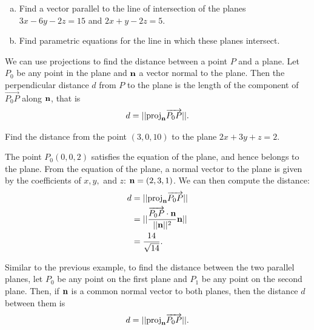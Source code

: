 \documentclass[12pt,letterpaper,reqno]{article}
\numberwithin{equation}{section}
\newcommand{\fixme}[1]{{\color{orange}{[#1]}}}
\begin{document}
\begin{exercise}
\begin{enumerate}[(a)]
	\item Find a vector parallel to the line of intersection of the planes $3x-6y-2z=15$ and $2x+y-2z=5$.	
	\item Find parametric equations for the line in which these planes intersect.
\end{enumerate}
\end{exercise}

\fixme{Add solution.}

\begin{example}
	We can use projections to find the distance between a point $P$ and a plane. Let $P_0$ be any point in the plane and ${\bf n}$ a vector normal to the plane. Then the perpendicular distance $d$ from $P$ to the plane is the length of the component of $\overrightarrow{P_0P}$ along ${\bf n}$, that is
	\begin{align*}
		d=||\text{proj}_{\bf n}\overrightarrow{P_0P}||.
	\end{align*}
\end{example}

\begin{exercise}
Find the distance from the point $(3,0,10)$ to the plane $2x+3y+z=2$.	
\end{exercise}

{\color{red} 
The point $P_0(0,0,2)$ satisfies the equation of the plane, and hence belongs to the plane. From the equation of the plane, a normal vector to the plane is given by the coefficients of $x,y,$ and $z$: ${\bf n}=(2,3,1)$. We can then compute the distance:
\begin{align*}
	d&=||\text{proj}_{\bf n}{\overrightarrow{P_0P}}|| \\
	&=||\frac{\overrightarrow{P_0P}\cdot {\bf n}}{||{\bf n}||^2}{\bf n}|| \\
	&=\frac{14}{\sqrt{14}}.
\end{align*}}

\begin{example}
	Similar to the previous example, to find the distance between the two parallel planes, let $P_0$ be any point on the first plane and $P_1$ be any point on the second plane. Then, if ${\bf n}$ is a common normal vector to both planes, then the distance $d$ between them is 
	\begin{align*}
		d=||\text{proj}_{\bf n}{\overrightarrow{P_0P}}||.
	\end{align*}
\end{example}
\end{document}
